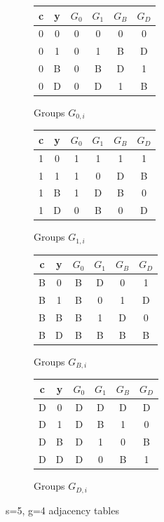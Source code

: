 \documentclass[11pt, oneside]{article} 	%
\begin{document}
\begin{figure}[!htb]
\begin{subfigure}{.25\textwidth}
\begin{tabular}{|| c c || c c c c || } 
 \hline
c & y & $G_0$ & $G_1$ & $G_B$ & $G_D$ \\ [0.5ex] 
 \hline\hline
  0 & 0 & 0 & 0 & 0 & 0 \\
  0 & 1 & 0 & 1 & B & D \\
  0 & B & 0 & B & D & 1 \\
  0 & D & 0 & D & 1 & B \\
 \hline
 \end{tabular}
\caption{Groups $G_{0,i}$}
\label{fig:gf4-0}
\end{subfigure}
\begin{subfigure}{.25\textwidth}
\begin{tabular}{|| c c || c c c c || } 
 \hline
c & y & $G_0$ & $G_1$ & $G_B$ & $G_D$ \\ [0.5ex] 
 \hline\hline
  1 & 0 & 1 & 1 & 1 & 1 \\
  1 & 1 & 1 & 0 & D & B \\
  1 & B & 1 & D & B & 0 \\
  1 & D & 0 & B & 0 & D \\
  \hline
  
  \end{tabular}
\caption{Groups $G_{1,i}$}
\end{subfigure}
\begin{subfigure}{.25\textwidth}
\begin{tabular}{|| c c || c c c c || } 
 \hline
c & y & $G_0$ & $G_1$ & $G_B$ & $G_D$ \\ [0.5ex] 
 \hline\hline
  \cellcolor{yellow}B & \cellcolor{yellow}0 & \cellcolor{yellow}B & \cellcolor{yellow}D & \cellcolor{yellow}0 & \cellcolor{yellow}1 \\
  \cellcolor{cyan}B & \cellcolor{cyan}1 & \cellcolor{cyan} B & \cellcolor{cyan}0 & \cellcolor{cyan}1 & \cellcolor{cyan} D \\
  B & B & B & 1 & D & 0 \\
  B & D & B & B & B & B \\
  \hline
 
  \end{tabular}
\caption{Groups $G_{B,i}$}
\label{fig:gf4-B}
\end{subfigure}
\begin{subfigure}{.25\textwidth}
\begin{tabular}{|| c c || c c c c || } 
 \hline
c & y & $G_0$ & $G_1$ & $G_B$ & $G_D$ \\ [0.5ex] 
 \hline\hline
  D & 0 & D & D & D & D \\
  D & 1 & D & B & 1 & 0 \\
  D & B & D & 1 & 0 & B \\
  D & D & D & 0 & B & 1 \\
  \hline
  
  \end{tabular}
\caption{Groups $G_{D,i}$}
\label{fig:gf4-D}
\end{subfigure}
\caption{s=5, g=4 adjacency tables}
\end{figure}
\end{document}
